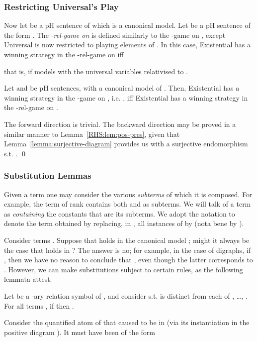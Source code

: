 \documentclass{LMCS}
\begin{document}
\subsubsection{Restricting Universal's Play}

Now let  be a pH sentence of which  is a canonical model. Let  be a pH sentence of the form   . The \emph{-rel-game on } is defined similarly to the -game on , except Universal is now restricted to playing elements of . In this case, Existential has a winning strategy in the -rel-game on  iff  

that is, if  models  with the universal variables relativised to .
\begin{prop}
\label{prop:restrict-universal}
Let  and  be pH sentences, with  a canonical model of . Then,
Existential has a winning strategy in the -game on , i.e. , iff Existential has a winning strategy in the -rel-game on .
\end{prop}
\proof
The forward direction is trivial. The backward direction may be proved in a similar manner to Lemma~\ref{RHS:lem:pos-pres}, given that Lemma~\ref{lemma:surjective-diagram} provides us with a surjective endomorphism  s.t. .
\qed

\subsubsection{Substitution Lemmas}

Given a term  one may consider the various \emph{subterms} of which it is composed. For example, the term   of rank  contains both  and  as subterms. We will talk of a term  as \emph{containing} the constants that are its subterms.
We adopt the notation  to denote the term obtained by replacing, in , all instances of  by  (nota bene  by ).

Consider terms .
Suppose that  holds in the canonical model ; might it always be the case that    holds in ? The answer is no; for example, in the case of digraphs, if , then we have no reason to conclude that , even though the latter corresponds to . However, we can make substitutions subject to certain rules, as the following lemmata attest. 

\begin{lem}
\label{lem:sub-terms}
Let  be a -ary relation symbol of , and consider  s.t.  is distinct from each of , \ldots, . For all terms , if  then .
\end{lem}
\proof
Consider the quantified atom of  that caused  to be in  (via its instantiation in the positive diagram ). It must have been of the form
\end{document}
